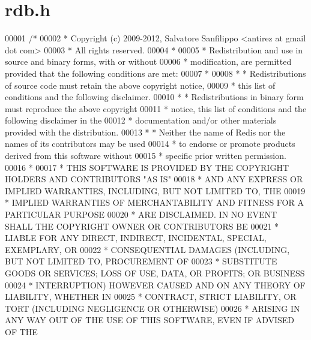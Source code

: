 \hypertarget{rdb_8h_source}{}\section{rdb.\+h}
\label{rdb_8h_source}

\begin{DoxyCode}
00001 \textcolor{comment}{/*}
00002 \textcolor{comment}{ * Copyright (c) 2009-2012, Salvatore Sanfilippo <antirez at gmail dot com>}
00003 \textcolor{comment}{ * All rights reserved.}
00004 \textcolor{comment}{ *}
00005 \textcolor{comment}{ * Redistribution and use in source and binary forms, with or without}
00006 \textcolor{comment}{ * modification, are permitted provided that the following conditions are met:}
00007 \textcolor{comment}{ *}
00008 \textcolor{comment}{ *   * Redistributions of source code must retain the above copyright notice,}
00009 \textcolor{comment}{ *     this list of conditions and the following disclaimer.}
00010 \textcolor{comment}{ *   * Redistributions in binary form must reproduce the above copyright}
00011 \textcolor{comment}{ *     notice, this list of conditions and the following disclaimer in the}
00012 \textcolor{comment}{ *     documentation and/or other materials provided with the distribution.}
00013 \textcolor{comment}{ *   * Neither the name of Redis nor the names of its contributors may be used}
00014 \textcolor{comment}{ *     to endorse or promote products derived from this software without}
00015 \textcolor{comment}{ *     specific prior written permission.}
00016 \textcolor{comment}{ *}
00017 \textcolor{comment}{ * THIS SOFTWARE IS PROVIDED BY THE COPYRIGHT HOLDERS AND CONTRIBUTORS "AS IS"}
00018 \textcolor{comment}{ * AND ANY EXPRESS OR IMPLIED WARRANTIES, INCLUDING, BUT NOT LIMITED TO, THE}
00019 \textcolor{comment}{ * IMPLIED WARRANTIES OF MERCHANTABILITY AND FITNESS FOR A PARTICULAR PURPOSE}
00020 \textcolor{comment}{ * ARE DISCLAIMED. IN NO EVENT SHALL THE COPYRIGHT OWNER OR CONTRIBUTORS BE}
00021 \textcolor{comment}{ * LIABLE FOR ANY DIRECT, INDIRECT, INCIDENTAL, SPECIAL, EXEMPLARY, OR}
00022 \textcolor{comment}{ * CONSEQUENTIAL DAMAGES (INCLUDING, BUT NOT LIMITED TO, PROCUREMENT OF}
00023 \textcolor{comment}{ * SUBSTITUTE GOODS OR SERVICES; LOSS OF USE, DATA, OR PROFITS; OR BUSINESS}
00024 \textcolor{comment}{ * INTERRUPTION) HOWEVER CAUSED AND ON ANY THEORY OF LIABILITY, WHETHER IN}
00025 \textcolor{comment}{ * CONTRACT, STRICT LIABILITY, OR TORT (INCLUDING NEGLIGENCE OR OTHERWISE)}
00026 \textcolor{comment}{ * ARISING IN ANY WAY OUT OF THE USE OF THIS SOFTWARE, EVEN IF ADVISED OF THE}

\end{DoxyCode}
